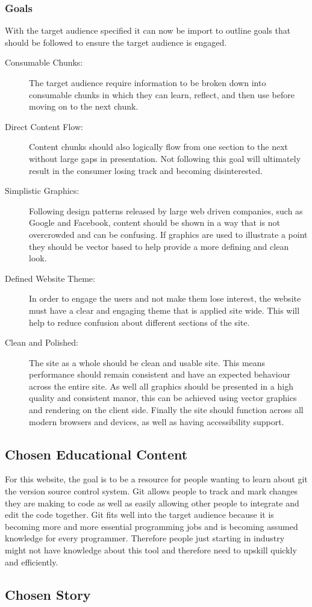 \subsubsection{Goals}
With the target audience specified it can now be import to outline goals that should be followed to ensure the target audience is engaged.
\begin{description}
	\item[Consumable Chunks:] The target audience require information to be broken down into consumable chunks in which they can learn, reflect, and then use before moving on to the next chunk.
	\item[Direct Content Flow:] Content chunks should also logically flow from one section to the next without large gaps in presentation. Not following this goal will ultimately result in the consumer losing track and becoming disinterested.
	\item[Simplistic Graphics:] Following design patterns released by large web driven companies, such as Google and Facebook, content should be shown in a way that is not overcrowded and can be confusing. If graphics are used to illustrate a point they should be vector based to help provide a more defining and clean look.
	\item[Defined Website Theme:] In order to engage the users and not make them lose interest, the website must have a clear and engaging theme that is applied site wide. This will help to reduce confusion about different sections of the site.
	\item[Clean and Polished:] The site as a whole should be clean and usable site. This means performance should remain consistent and have an expected behaviour across the entire site. As well all graphics should be presented in a high quality and consistent manor, this can be achieved using vector graphics and rendering on the client side. Finally the site should function across all modern browsers and devices, as well as having accessibility support.
\end{description}


\subsection{Chosen Educational Content}
For this website, the goal is to be a resource for people wanting to learn about git the version source control system. Git allows people to track and mark changes they are making to code as well as easily allowing other people to integrate and edit the code together. Git fits well into the target audience because it is becoming more and more essential programming jobs and is becoming assumed knowledge for every programmer. Therefore people just starting in industry might not have knowledge about this tool and therefore need to upskill quickly and efficiently.

\subsection{Chosen Story}
